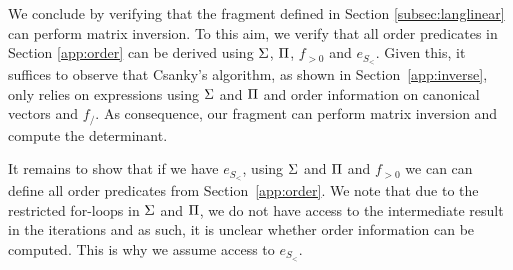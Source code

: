 
We conclude by verifying that the fragment defined in Section \ref{subsec:langlinear}
can perform matrix inversion. To this aim, we verify that all order
predicates in Section \ref{app:order} can be derived using $\Sigma$, $\Pi$, $f_{>0}$ and 
$e_{S_{<}}$. Given this, it suffices to observe that Csanky's algorithm, as shown in Section~\ref{app:inverse}, only relies on expressions using $\Sigma$ and $\Pi$ and order information on canonical vectors and $f_/$.
As consequence, our fragment can perform matrix inversion and compute the determinant.


It remains to show that if we have $e_{S_{<}}$, using $\Sigma$ and $\Pi$ and $f_{>0}$ we can
can define all order predicates from Section~\ref{app:order}. We note that due to the restricted for-loops
in $\Sigma$ and $\Pi$, we do not have access to the intermediate
result in the iterations and as such, it is unclear whether order information can be computed. This is why
we assume access to $e_{S_<}$.

